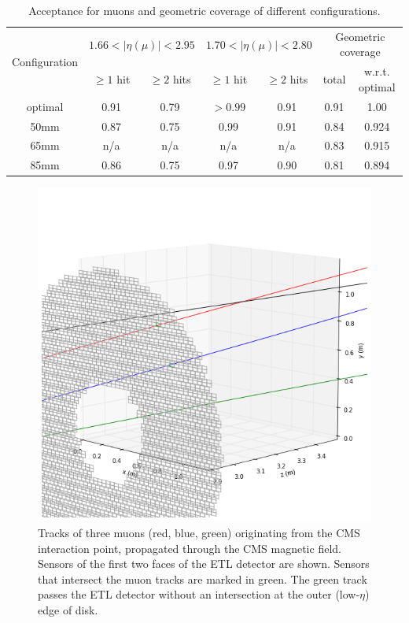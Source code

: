 \documentclass[11pt]{article}
\begin{document}
\begin{table}
  \caption{Acceptance for muons and geometric coverage of different configurations.}
  \label{tab:coverage}
  \begin{tabular}{c|cc|cc|cc}
    \multirow{2}{*}{Configuration} & \multicolumn{2}{c|}{$1.66<|\eta(\mu)|<2.95$} & \multicolumn{2}{c|}{$1.70<|\eta(\mu)|<2.80$} & \multicolumn{2}{c}{Geometric coverage} \\
                  & $\geq1$ hit & $\geq2$ hits  & $\geq1$ hit & $\geq2$ hits  & total & w.r.t. optimal \\ \hline
    optimal       & 0.91        & 0.79          & $>0.99$     & 0.91          & 0.91  & 1.00            \\
    50mm          & 0.87        & 0.75          & 0.99        & 0.91          & 0.84  & 0.924 \\
    65mm          & n/a         & n/a           & n/a         & n/a           & 0.83  & 0.915 \\
    85mm          & 0.86        & 0.75          & 0.97        & 0.90          & 0.81  & 0.894

  \end{tabular}
\end{table}

\begin{figure}[!ht]
\centering
\includegraphics[width=0.70 \textwidth]{figures/intersect_3D.png}
\caption{
Tracks of three muons (red, blue, green) originating from the CMS interaction point, propagated through the CMS magnetic field.
Sensors of the first two faces of the ETL detector are shown.
Sensors that intersect the muon tracks are marked in green.
The green track passes the ETL detector without an intersection at the outer (low-$\eta$) edge of disk.
}
\label{fig:intersect}
\end{figure}
\end{document}
